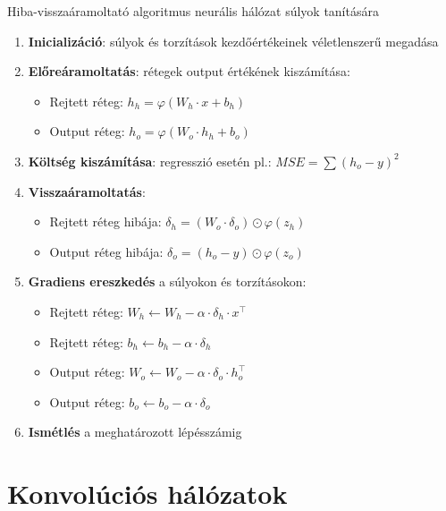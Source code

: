 \documentclass[english, aspectratio=169]{beamer}
\makeatletter
\let\origtableofcontents=\tableofcontents
\def\tableofcontents{\@ifnextchar[{\origtableofcontents}{\gobbletableofcontents}}
\def\gobbletableofcontents#1{\origtableofcontents}
\makeatother
\begin{document}
\begin{frame}{Hiba-visszaáramoltató algoritmus neurális hálózat súlyok tanítására}
\begin{enumerate}
	\item \textbf{Inicializáció}: súlyok és torzítások kezdőértékeinek véletlenszerű megadása
	\item \textbf{Előreáramoltatás}: rétegek output értékének kiszámítása: 
	\begin{itemize}
		\item Rejtett réteg: $h_h = \varphi(W_h \cdot x + b_h)$
		\item Output réteg: $h_o = \varphi(W_o \cdot h_h + b_o)$
	\end{itemize}
	\item \textbf{Költség kiszámítása}: regresszió esetén pl.: $MSE = \sum \left( h_o - y \right)^2$
	\item \textbf{Visszaáramoltatás}: 
	\begin{itemize}
		\item Rejtett réteg hibája: $\delta_h=(W_o \cdot \delta_o) \odot \varphi(z_h)$
		\item Output réteg hibája: $\delta_o=(h_o - y) \odot \varphi(z_o)$
	\end{itemize}
	\item \textbf{Gradiens ereszkedés} a súlyokon és torzításokon:
	\begin{itemize}
		\item Rejtett réteg: $W_h \leftarrow W_h - \alpha \cdot \delta_h \cdot x^\top$
		\item Rejtett réteg: $b_h \leftarrow b_h - \alpha \cdot \delta_h$	
		\item Output réteg: $W_o \leftarrow W_o - \alpha \cdot \delta_o \cdot h_o^\top$
		\item Output réteg: $b_o \leftarrow b_o - \alpha \cdot \delta_o$

	\end{itemize}
	\item \textbf{Ismétlés} a meghatározott lépésszámig
\end{enumerate}
\end{frame}

\section{Konvolúciós hálózatok}

\begin{frame}
\tableofcontents[currentsection]
\end{frame}
\end{document}
